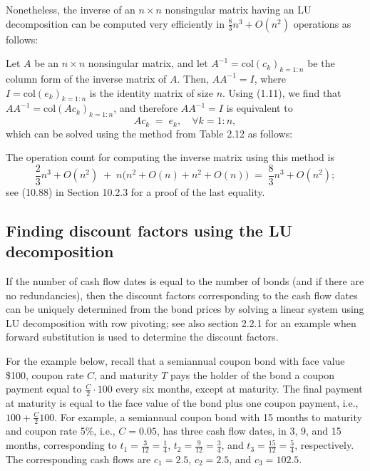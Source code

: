Nonetheless, the inverse of an $n\times n$ nonsingular matrix having an LU
decomposition can be computed very efficiently in $\frac83n^3+O(n^2)$ operations as
follows:

Let $A$ be an $n\times n$ nonsingular matrix, and let $A^{-1} = \text{col}(c_k)_{k=1:n}$
be the column form of the inverse matrix of $A$. Then, $AA^{-1}=I$, where
$I=\text{col}(e_k)_{k=1:n}$ is the identity matrix of size $n$. Using (1.11), we find
that $AA^{-1}=\text{col}(Ac_k)_{k=1:n}$, and therefore $AA^{-1}=I$ is equivalent to
\[
Ac_k \;=\; e_k, \quad \forall k=1:n,
\]
which can be solved using the method from Table 2.12 as follows:

\begin{center}
\end{center}

The operation count for computing the inverse matrix using this method is
\begin{equation}
\frac23n^3+O(n^2) \;+\; n\bigl(n^2+O(n)+n^2+O(n)\bigr) \;=\; \frac83n^3+O(n^2);
\end{equation}
see (10.88) in Section 10.2.3 for a proof of the last equality.

\subsection{Finding discount factors using the LU decomposition}

If the number of cash flow dates is equal to the number of bonds (and if there are
no redundancies), then the discount factors corresponding to the cash flow dates can
be uniquely determined from the bond prices by solving a linear system using LU
decomposition with row pivoting; see also section 2.2.1 for an example when forward
substitution is used to determine the discount factors.

For the example below, recall that a semiannual coupon bond with face value \$100,
coupon rate $C$, and maturity $T$ pays the holder of the bond a coupon payment equal
to $\frac{C}{2}\cdot100$ every six months, except at maturity. The final payment at
maturity is equal to the face value of the bond plus one coupon payment, i.e.,
$100+\frac{C}{2}100$. For example, a semiannual coupon bond with 15 months to
maturity and coupon rate 5\%, i.e., $C=0.05$, has three cash flow dates, in 3, 9,
and 15 months, corresponding to $t_1=\frac{3}{12}=\frac14$, $t_2=\frac9{12}=\frac34$,
and $t_3=\frac{15}{12}=\frac54$, respectively. The corresponding cash flows are
$c_1=2.5$, $c_2=2.5$, and $c_3=102.5$.

